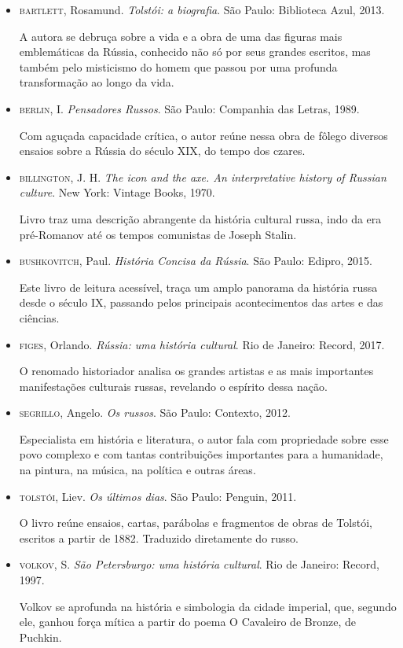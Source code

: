 \documentclass[12pt]{extarticle}
\begin{document}
\begin{itemize}
\item\textsc{bartlett}, Rosamund. \textit{Tolstói: a biografia}. São Paulo: Biblioteca Azul, 2013.

A autora se debruça sobre a vida e a obra de uma das figuras mais
emblemáticas da Rússia, conhecido não só por seus grandes escritos, mas
também pelo misticismo do homem que passou por uma profunda
transformação ao longo da vida.

\item\textsc{berlin}, I. \textit{Pensadores Russos}. São Paulo: Companhia das Letras, 1989.

Com aguçada capacidade crítica, o autor reúne nessa obra de fôlego
diversos ensaios sobre a Rússia do século XIX, do tempo dos czares.

\item\textsc{billington}, J. H. \textit{The icon and the axe. An interpretative
history of Russian culture}. New York: Vintage Books, 1970.

Livro traz uma descrição abrangente da história cultural russa, indo da
era pré-Romanov até os tempos comunistas de Joseph Stalin.

\item\textsc{bushkovitch}, Paul. \textit{História Concisa da Rússia}. São Paulo:
Edipro, 2015.

Este livro de leitura acessível, traça um amplo panorama da história
russa desde o século IX, passando pelos principais acontecimentos das
artes e das ciências.

\item\textsc{figes}, Orlando. \textit{Rússia: uma história cultural}. Rio de Janeiro: Record, 2017.

O renomado historiador analisa os grandes artistas e as mais importantes
manifestações culturais russas, revelando o espírito dessa nação.

\item\textsc{segrillo}, Angelo. \textit{Os russos}. São Paulo: Contexto, 2012.

Especialista em história e literatura, o autor fala com propriedade
sobre esse povo complexo e com tantas contribuições importantes para a
humanidade, na pintura, na música, na política e outras áreas.

\item\textsc{tolstói}, Liev. \textit{Os últimos dias}. São Paulo: Penguin, 2011.

O livro reúne ensaios, cartas, parábolas e fragmentos de obras de
Tolstói, escritos a partir de 1882. Traduzido diretamente do russo.

\item\textsc{volkov}, S. \textit{São Petersburgo: uma história cultural}. Rio de
Janeiro: Record, 1997.

Volkov se aprofunda na história e simbologia da cidade imperial, que,
segundo ele, ganhou força mítica a partir do poema O Cavaleiro de
Bronze, de Puchkin.
\end{itemize}
\end{document}
